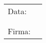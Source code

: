 \documentclass[italian,12pt]{article} %
\begin{document}
\begin{table}[b]
	\begin{tabular}{@{}p{.5in}p{4in}@{}}
		Data:  & \hrulefill \\
			   &     		\\
			   &     		\\
		Firma: & \hrulefill \\
	\end{tabular}
	\end{table}
\end{document}
